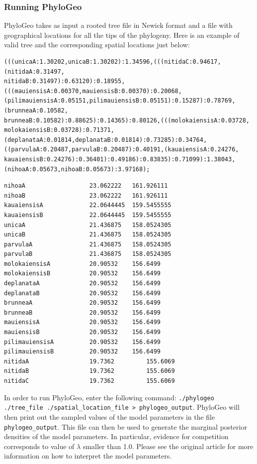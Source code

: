 \documentclass[a4paper,12pt]{article}
\newcommand{\x}[1]{\texttt{#1}}
\begin{document}
\subsubsection{Running PhyloGeo} PhyloGeo takes as input a rooted tree file in Newick format and a file
with geographical locations for all the tips of the phylogeny. Here is an example of valid tree and
the corresponding spatial locations just below:


\begin{scriptsize}
\begin{Verbatim}[frame=single, label=Valid PhyloGeo input tree, samepage=true, baselinestretch=0.5]
(((unicaA:1.30202,unicaB:1.30202):1.34596,(((nitidaC:0.94617,(nitidaA:0.31497,
nitidaB:0.31497):0.63120):0.18955,(((mauiensisA:0.00370,mauiensisB:0.00370):0.20068,
(pilimauiensisA:0.05151,pilimauiensisB:0.05151):0.15287):0.78769,(brunneaA:0.10582,
brunneaB:0.10582):0.88625):0.14365):0.80126,(((molokaiensisA:0.03728,
molokaiensisB:0.03728):0.71371,(deplanataA:0.01814,deplanataB:0.01814):0.73285):0.34764,
((parvulaA:0.20487,parvulaB:0.20487):0.40191,(kauaiensisA:0.24276,
kauaiensisB:0.24276):0.36401):0.49186):0.83835):0.71099):1.38043,
(nihoaA:0.05673,nihoaB:0.05673):3.97168);
\end{Verbatim}

\begin{Verbatim}[frame=single, label=Valid PhyloGeo spatial location file, samepage=true, baselinestretch=0.5]
nihoaA                  23.062222	161.926111
nihoaB                  23.062222	161.926111
kauaiensisA             22.0644445	159.5455555
kauaiensisB             22.0644445	159.5455555
unicaA                  21.436875	158.0524305
unicaB                  21.436875	158.0524305
parvulaA                21.436875	158.0524305
parvulaB                21.436875	158.0524305
molokaiensisA           20.90532	156.6499
molokaiensisB           20.90532	156.6499
deplanataA              20.90532	156.6499
deplanataB              20.90532	156.6499
brunneaA                20.90532	156.6499
brunneaB                20.90532	156.6499
mauiensisA              20.90532	156.6499
mauiensisB              20.90532	156.6499
pilimauiensisA          20.90532	156.6499
pilimauiensisB          20.90532	156.6499
nitidaA                 19.7362	        155.6069
nitidaB                 19.7362	        155.6069
nitidaC                 19.7362	        155.6069
\end{Verbatim}
\end{scriptsize}

In order to run PhyloGeo, enter the following command: \x{./phylogeo ./tree\_file
  ./spatial\_location\_file > phylogeo\_output}.
PhyloGeo will then print out the sampled values of the model parameters in the file
\x{phylogeo\_output}. This file can then be used to generate the marginal posterior densities of the
model parameters. In particular, evidence for competition corresponds to value of $\lambda$ smaller
than 1.0. Please see the original article for more information on how to interpret the model
parameters.
\end{document}
